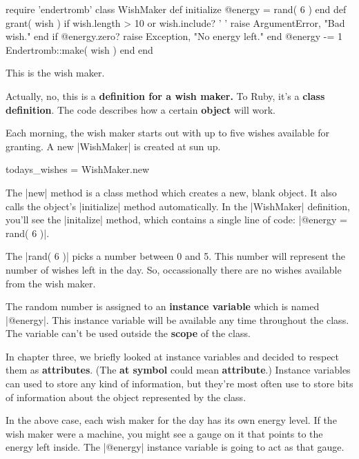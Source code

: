 \documentclass[12pt,twoside]{report}
\begin{document}
\begin{rubycode}

 require 'endertromb'
 class WishMaker
   def initialize
     @energy = rand( 6 )
   end
   def grant( wish )
     if wish.length > 10 or wish.include? ' '
       raise ArgumentError, "Bad wish."
     end
     if @energy.zero?
       raise Exception, "No energy left."
     end
     @energy -= 1
     Endertromb::make( wish )
   end
 end

\end{rubycode}


This is the wish maker.

Actually, no, this is a {\bf definition for a wish maker.}  To Ruby,
it's a {\bf class definition}. The code describes how a certain {\bf
  object} will work.

Each morning, the wish maker starts out with up to five wishes
available for granting. A new \rubyinline|WishMaker|
is created at sun up.


\begin{rubycode}

 todays_wishes = WishMaker.new

\end{rubycode}


The \rubyinline|new| method is a class method which
creates a new, blank object.  It also calls the object's
\rubyinline|initialize| method automatically.  In the
\rubyinline|WishMaker| definition, you'll see the
\rubyinline|initalize| method, which contains a single
line of code: \rubyinline|@energy = rand( 6 )|.

The \rubyinline|rand( 6 )| picks a number between 0
and 5.  This number will represent the number of wishes left in the
day.  So, occassionally there are no wishes available from the wish
maker.

The random number is assigned to an {\bf instance variable} which is
named \rubyinline|@energy|. This instance variable
will be available any time throughout the class.  The variable can't
be used outside the {\bf scope} of the class.

In chapter three, we briefly looked at instance variables and decided
to respect them as {\bf attributes}.  (The {\bf at symbol} could mean
{\bf attribute}.)  Instance variables can used to store any kind of
information, but they're most often use to store bits of information
about the object represented by the class.

In the above case, each wish maker for the day has its own energy
level.  If the wish maker were a machine, you might see a gauge on it
that points to the energy left inside. The
\rubyinline|@energy| instance variable is going to act
as that gauge.
\end{document}
